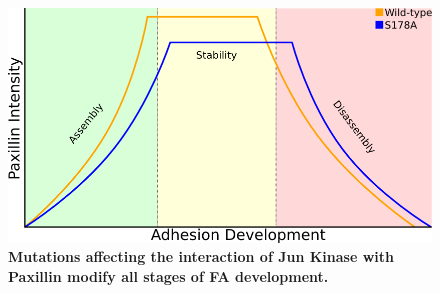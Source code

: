 \begin{figure}[htbp]
\begin{center}
\includegraphics[width=\textwidth]{../figures/S178A/sample_timecourse}
\end{center}
\caption{
{\bf Mutations affecting the interaction of Jun Kinase with Paxillin modify all
stages of FA development.}  }
\label{summary}
\end{figure}
